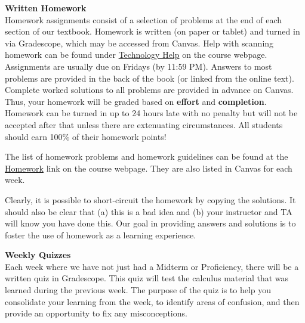 \documentclass[12pt]{article}
\renewcommand{\emph}[1]{\textsf{\textbf{#1}}}
\newcommand{\localhead}[1]{\par\smallskip\textbf{#1}\nobreak\\}%
\def\heading#1{\localhead{\large\emph{#1}}}
\begin{document}

\heading{Written Homework}
Homework assignments consist of a selection of problems at the end of each section of our textbook. Homework is written (on paper or tablet) and turned in via Gradescope, which may be accessed from Canvas.  Help with scanning homework can be found under \href{https://uaf-math.github.io/calc1/techHelp.html}{Technology Help} on the course webpage. Assignments are usually due on Fridays (by 11:59 PM).  Answers to most problems are provided in the back of the book (or linked from the online text). Complete worked solutions to all problems are provided in advance on Canvas. Thus, your homework will be graded based on \emph{effort} and \emph{completion}. Homework can be turned in up to 24 hours late with no penalty but will not be accepted after that unless there are extenuating circumstances. All students should earn 100\% of their homework points!

The list of homework problems and homework guidelines can be found at the \href{https://uaf-math.github.io/calc1/newhomework.html}{Homework} link on the course webpage. They are also listed in Canvas for each week.

Clearly, it is possible to short-circuit the homework by copying the solutions. It should also be clear that (a) this is a bad idea and (b) your instructor and TA will know you have done this. Our goal in providing answers and solutions is to foster the use of homework as a learning experience. \\

\heading{Weekly Quizzes}
Each week where we have not just had a Midterm or Proficiency, there will be a written quiz in Gradescope. This quiz will test the calculus material that was learned during the previous week. The purpose of the quiz is to help you consolidate your learning from the week, to identify areas of confusion, and then provide an opportunity to fix any misconceptions.  
\end{document}
